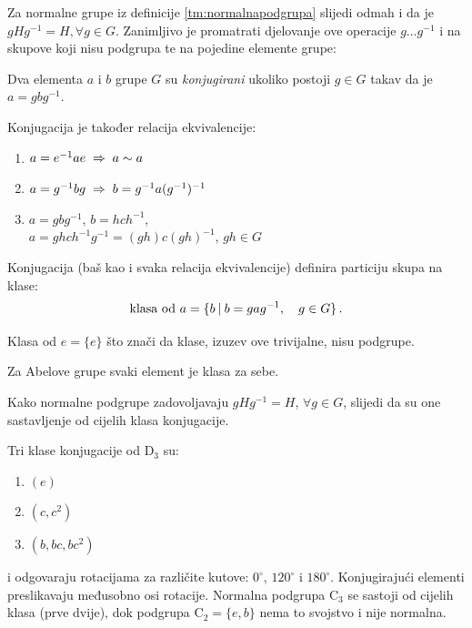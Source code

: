 Za normalne grupe iz definicije \ref{tm:normalnapodgrupa} slijedi odmah i
da je $g H g^{-1} = H, \forall g\in G$. Zanimljivo je promatrati djelovanje
ove operacije $g \ldots g^{-1}$ i na skupove koji nisu podgrupa te
na pojedine elemente grupe:

\begin{definicija}
Dva elementa $a$ i $b$ grupe $G$ su \emph{konjugirani} ukoliko
postoji $g\in G$ takav da je $a=gbg^{-1}$.
\label{tm:konjugacija}
\end{definicija}

Konjugacija je također relacija ekvivalencije:
     
\begin{enumerate}
\item $a=e^{-1} a e  \;\Rightarrow\; a\sim a$
\item $a=g^{-1} b g  \;\Rightarrow\;  b= g^{-1} a (g^{-1})^{-1}$
\item $a=g b g^{-1}$, $b=hch^{-1}$, \\
         $a=ghch^{-1}g^{-1}=(gh)c(gh)^{-1}$, $gh\in G$
  
\end{enumerate}


Konjugacija (baš kao i svaka relacija ekvivalencije) definira
particiju skupa na klase:
\begin{displaymath}
   \text{klasa od $a$} = \{ b \: | \: b=gag^{-1},\quad g\in G\} \,.
\end{displaymath}

Klasa od $e=\{e\}$ što znači da klase, izuzev ove trivijalne, nisu podgrupe.

Za Abelove grupe svaki element je klasa za sebe. 

Kako normalne podgrupe zadovoljavaju $gHg^{-1}=H$, $\forall g\in G$, slijedi
da su one sastavljenje od cijelih klasa konjugacije.

\begin{primjer} \label{pr:klaseD3}
Tri klase konjugacije  od D$_3$ su: 
\begin{enumerate}
\item $(e)$
\item $(c, c^{2})$
\item $(b, bc, bc^2)$
\end{enumerate}
i odgovaraju rotacijama za različite kutove: $0^\circ$, $120^\circ$ i
$180^\circ$. Konjugirajući elementi
preslikavaju međusobno osi rotacije. Normalna podgrupa $\mathrm{C}_3$ se
sastoji od cijelih klasa (prve dvije), dok podgrupa $\mathrm{C}_2=\{e,b\}$ nema
to svojstvo i nije normalna.
\end{primjer}

